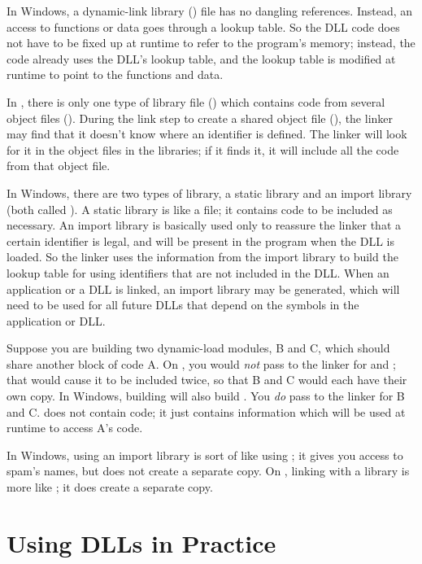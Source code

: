 \documentclass{manual}
\begin{document}
In Windows, a dynamic-link library () file has no dangling
references.  Instead, an access to functions or data goes through a
lookup table.  So the DLL code does not have to be fixed up at runtime
to refer to the program's memory; instead, the code already uses the
DLL's lookup table, and the lookup table is modified at runtime to
point to the functions and data.

In \UNIX{}, there is only one type of library file () which
contains code from several object files ().  During the link
step to create a shared object file (), the linker may find
that it doesn't know where an identifier is defined.  The linker will
look for it in the object files in the libraries; if it finds it, it
will include all the code from that object file.

In Windows, there are two types of library, a static library and an
import library (both called ).  A static library is like a
\UNIX{}  file; it contains code to be included as necessary.
An import library is basically used only to reassure the linker that a
certain identifier is legal, and will be present in the program when
the DLL is loaded.  So the linker uses the information from the
import library to build the lookup table for using identifiers that
are not included in the DLL.  When an application or a DLL is linked,
an import library may be generated, which will need to be used for all
future DLLs that depend on the symbols in the application or DLL.

Suppose you are building two dynamic-load modules, B and C, which should
share another block of code A.  On \UNIX{}, you would \emph{not} pass
 to the linker for  and ; that would
cause it to be included twice, so that B and C would each have their
own copy.  In Windows, building  will also build
.  You \emph{do} pass  to the linker for B and
C.   does not contain code; it just contains information
which will be used at runtime to access A's code.  

In Windows, using an import library is sort of like using ; it gives you access to spam's names, but does not create a
separate copy.  On \UNIX{}, linking with a library is more like
; it does create a separate copy.


\section{Using DLLs in Practice \label{win-dlls}}
\end{document}
